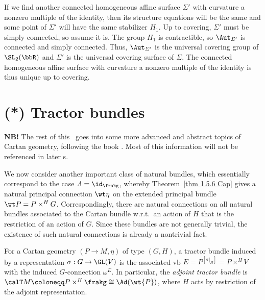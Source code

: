 If we find another connected homogeneous affine surface $\varSigma'$ with curvature a nonzero multiple of the identity, then its structure equations will be the same and some point of $\varSigma'$ will have the same stabilizer $H_1$. Up to covering, $\varSigma'$ must be simply connected, so assume it is. The group $H_1$ is contractible, so $\Aut_{\varSigma'}$ is connected and simply connected. Thus, $\Aut_{\varSigma'}$ is the universal covering group of $\SL_2(\bbR)$ and $\varSigma'$ is the universal covering surface of $\varSigma$. The connected homogeneous affine surface with curvature a nonzero multiple of the identity is thus unique up to covering.





\section{(*) Tractor bundles}\label{sec: tractor bundles}

\textbf{NB!} The rest of this \chap\ goes into some more advanced and abstract topics of Cartan geometry, following the book \cite{Cap}. Most of this information will not be referenced in later \chap s.

We now consider another important class of natural bundles, which essentially correspond to the case $\varLambda=\id_\frakg$, whereby Theorem~\ref{thm 1.5.6 Cap} gives a natural principal connection $\wt\eta$ on the extended principal bundle $\wt P=P\times^H G$. Correspondingly, there are natural connections on all natural bundles associated to the Cartan bundle w.r.t.\ an action of $H$ that is the restriction of an action of $G$. Since these bundles are not generally trivial, the existence of such natural connections is already a nontrivial fact.

\begin{defn}
    For a Cartan geometry $(P\to M,\eta)$ of type $(G,H)$, a tractor bundle induced by a representation $\sigma:G\to \GL(V)$ is the associated \gls{vb} $E=P^{[\sigma|_H]}=P\times^H V$ with the induced $G$-connection $\omega^E$. In particular, the \emph{adjoint tractor bundle} is $\calT M\coloneqq P\times^H \frakg\cong \Ad(\wt{P})$, where $H$ acts by restriction of the adjoint representation.
\end{defn}

